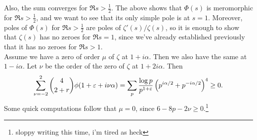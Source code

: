 Also, the sum converges for $\Re s > \frac{1}{2}$. The above shows that $\Phi(s)$ is meromorphic for $\Re s > \frac{1}{2}$, and we want to see that its only simple pole is at $s = 1$. Moreover, poles of $\Phi(s)$ for $\Re s > \frac{1}{2}$ are poles of $\zeta'(s)/\zeta(s)$, so it is enough to show that $\zeta(s)$ has no zeroes for $\Re s = 1$, since we've already established previously that it has no zeroes for $\Re s > 1$.
\\[8pt]
Assume we have a zero of order $\mu$ of $\zeta$ at $1 + i\alpha$. Then we also have the same at $1 - i\alpha$. Let $\nu$ be the order of the zero of $\zeta$ at $1 + 2 i \alpha$. Then
\[ \sum_{\nu = -2}^2 \binom{4}{2+r} \phi(1 + \varepsilon + i \nu \alpha) = \sum_p \frac{\log p}{p^{1+\varepsilon}} \left(p^{i \alpha/2} + p^{-i\alpha/2}\right)^4 \geq 0. \]
Some quick computations follow that $\mu = 0$, since $6 - 8p - 2\nu \geq 0$.\footnote{sloppy writing this time, i'm tired as heck}